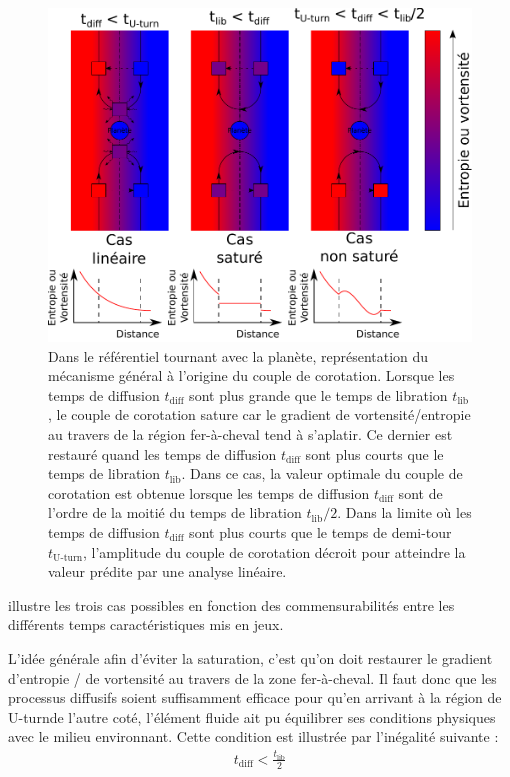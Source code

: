 \begin{figure}[htbp]
\centering
\includegraphics[width=0.75\linewidth]{figure/corotation_principle.pdf}
\caption{Dans le référentiel tournant avec la planète, représentation du mécanisme général à l'origine du couple de corotation. Lorsque les temps de diffusion $t_\text{diff}$ sont plus grande que le temps de libration $t_\text{lib}$, le couple de corotation sature car le gradient de vortensité/entropie au travers de la région fer-à-cheval tend à s'aplatir. Ce dernier est restauré quand les temps de diffusion $t_\text{diff}$ sont plus courts que le temps de libration $t_\text{lib}$. Dans ce cas, la valeur optimale du couple de corotation est obtenue lorsque les temps de diffusion $t_\text{diff}$ sont de l'ordre de la moitié du temps de libration $t_\text{lib}/2$. Dans la limite où les temps de diffusion $t_\text{diff}$ sont plus courts que le temps de demi-tour $t_\text{U-turn}$, l'amplitude du couple de corotation décroit pour atteindre la valeur prédite par une analyse linéaire.}\label{fig:corotation_principle}
\end{figure}

 illustre les trois cas possibles en fonction des commensurabilités entre les différents temps caractéristiques mis en jeux.

L'idée générale afin d'éviter la saturation, c'est qu'on doit restaurer le gradient d'entropie / de vortensité au travers de la zone fer-à-cheval. Il faut donc que les processus diffusifs soient suffisamment efficace pour qu'en arrivant à la région de \og U-turn\fg de l'autre coté, l'élément fluide ait pu équilibrer ses conditions physiques avec le milieu environnant. Cette condition est illustrée par l'inégalité suivante : 
\begin{align}
t_\text{diff} < \frac{t_\text{lib}}{2}
\end{align}

